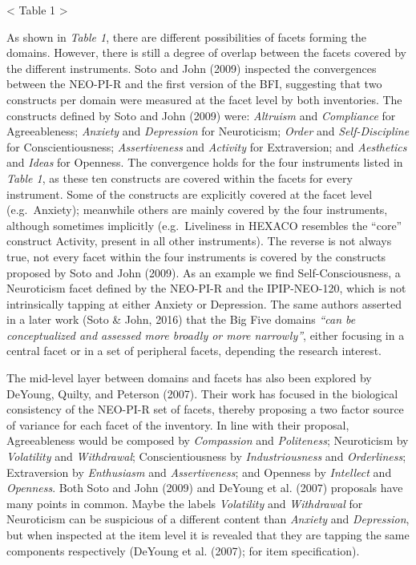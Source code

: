 \documentclass[,man,floatsintext]{apa6}
\theoremstyle{definition}
\theoremstyle{definition}
\theoremstyle{definition}
\theoremstyle{remark}
\begin{document}
\textless{} Table 1 \textgreater{}

\vspace{5mm}

As shown in \emph{Table 1}, there are different possibilities of facets
forming the domains. However, there is still a degree of overlap between
the facets covered by the different instruments. Soto and John (2009)
inspected the convergences between the NEO-PI-R and the first version of
the BFI, suggesting that two constructs per domain were measured at the
facet level by both inventories. The constructs defined by Soto and John
(2009) were: \emph{Altruism} and \emph{Compliance} for Agreeableness;
\emph{Anxiety} and \emph{Depression} for Neuroticism; \emph{Order} and
\emph{Self-Discipline} for Conscientiousness; \emph{Assertiveness} and
\emph{Activity} for Extraversion; and \emph{Aesthetics} and \emph{Ideas}
for Openness. The convergence holds for the four instruments listed in
\emph{Table 1}, as these ten constructs are covered within the facets
for every instrument. Some of the constructs are explicitly covered at
the facet level (e.g.~Anxiety); meanwhile others are mainly covered by
the four instruments, although sometimes implicitly (e.g.~Liveliness in
HEXACO resembles the \enquote{core} construct Activity, present in all
other instruments). The reverse is not always true, not every facet
within the four instruments is covered by the constructs proposed by
Soto and John (2009). As an example we find Self-Consciousness, a
Neuroticism facet defined by the NEO-PI-R and the IPIP-NEO-120, which is
not intrinsically tapping at either Anxiety or Depression. The same
authors asserted in a later work (Soto \& John, 2016) that the Big Five
domains \emph{\enquote{can be conceptualized and assessed more broadly
or more narrowly}}, either focusing in a central facet or in a set of
peripheral facets, depending the research interest.

The mid-level layer between domains and facets has also been explored by
DeYoung, Quilty, and Peterson (2007). Their work has focused in the
biological consistency of the NEO-PI-R set of facets, thereby proposing
a two factor source of variance for each facet of the inventory. In line
with their proposal, Agreeableness would be composed by
\emph{Compassion} and \emph{Politeness}; Neuroticism by
\emph{Volatility} and \emph{Withdrawal}; Conscientiousness by
\emph{Industriousness} and \emph{Orderliness}; Extraversion by
\emph{Enthusiasm} and \emph{Assertiveness}; and Openness by
\emph{Intellect} and \emph{Openness}. Both Soto and John (2009) and
DeYoung et al. (2007) proposals have many points in common. Maybe the
labels \emph{Volatility} and \emph{Withdrawal} for Neuroticism can be
suspicious of a different content than \emph{Anxiety} and
\emph{Depression}, but when inspected at the item level it is revealed
that they are tapping the same components respectively (DeYoung et al.
(2007); for item specification).
\end{document}
